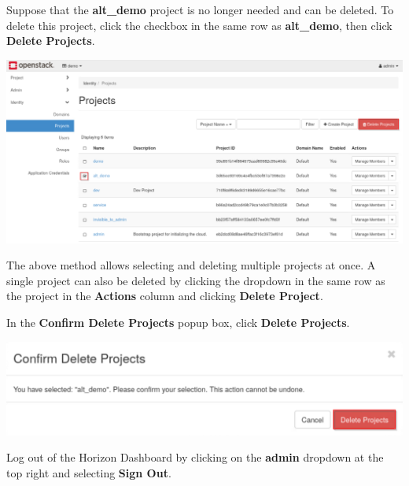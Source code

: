 \documentclass[letterpaper, 12pt]{article}
\begin{document}
\begin{enumerate}
    \begin{labstep}
        Suppose that the \textbf{alt\_demo} project is no longer needed and can be deleted.
        To delete this project, click the checkbox in the same row as \textbf{alt\_demo}, then click \textbf{Delete Projects}.

        \begin{center}
            \includegraphics[width=\linewidth]{images/part1/step7.png}
        \end{center}
    \end{labstep}

    \begin{tipbox}
        The above method allows selecting and deleting multiple projects at once.
        A single project can also be deleted by clicking the dropdown in the same row as the project in the \textbf{Actions} column and clicking \textbf{Delete Project}.
    \end{tipbox}

    \begin{labstep}
        In the \textbf{Confirm Delete Projects} popup box, click \textbf{Delete Projects}.

        \begin{center}
            \includegraphics[width=\linewidth]{images/part1/step8.png}
        \end{center}
    \end{labstep}

    \begin{labstep}
        Log out of the Horizon Dashboard by clicking on the \textbf{admin} dropdown at the top right and selecting \textbf{Sign Out}.


\end{labstep}
\end{enumerate}
\end{document}
